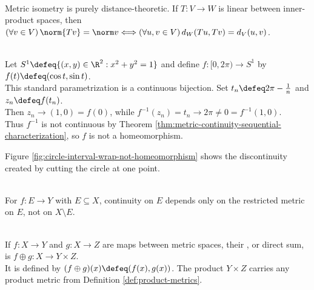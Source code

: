 \begin{remark} \label{rem:metric-versus-linear-isometries} \\
Metric isometry is purely distance-theoretic. If $T:V\to W$ is linear between inner-product spaces, then\\
$(\forall v\in V)\,\norm{Tv}=\norm v\Longleftrightarrow(\forall u,v\in V)\,d_W(Tu,Tv)=d_V(u,v)$.
\end{remark}

\begin{counterexample} \label{cex:circle-param-continuous-bijection-not-homeomorphism} \\
Let $S^1\defeq\{(x,y)\in\R^2:x^2+y^2=1\}$ and define $f:[0,2\pi)\to S^1$ by $f(t)\defeq(\cos t,\sin t)$.\\
This standard parametrization is a continuous bijection. Set $t_n\defeq 2\pi-\frac{1}{n}$ and $z_n\defeq f(t_n)$.\\
Then $z_n\to(1,0)=f(0)$, while $f^{-1}(z_n)=t_n\to2\pi\neq0=f^{-1}(1,0)$.\\
Thus $f^{-1}$ is not continuous by Theorem \ref{thm:metric-continuity-sequential-characterization}, so $f$ is not a homeomorphism.
\end{counterexample}

Figure \ref{fig:circle-interval-wrap-not-homeomorphism} shows the discontinuity created by cutting the circle at one point.
\begin{illustrationfigure}[H]
  \centering
  
  \caption{Parametrization $[0,2\pi)\to S^1$ wraps continuously and bijectively, but inverse jumps at $(1,0)$.}
  \label{fig:circle-interval-wrap-not-homeomorphism}
\end{illustrationfigure}

\begin{remark} \label{rem:continuity-domain-only} \\
For $f:E\to Y$ with $E\subseteq X$, continuity on $E$ depends only on the restricted metric on $E$, not on $X\setminus E$.
\end{remark}

\begin{definition} \label{def:product-map-direct-sum} \\
If $f:X\to Y$ and $g:X\to Z$ are maps between metric spaces, their , or direct sum, is $f\oplus g:X\to Y\times Z$.\\
It is defined by $(f\oplus g)(x)\defeq(f(x),g(x))$. The product $Y\times Z$ carries any product metric from Definition \ref{def:product-metrics}.
\end{definition}

